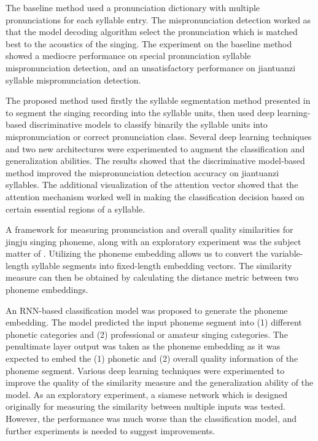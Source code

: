 The baseline method used a pronunciation dictionary with multiple pronunciations for each syllable entry. The mispronunciation detection worked as that the model decoding algorithm select the pronunciation which is matched best to the acoustics of the singing. The experiment on the baseline method showed a mediocre performance on special pronunciation syllable mispronunciation detection, and an unsatisfactory performance on jiantuanzi syllable mispronunciation detection.

The proposed method used firstly the syllable segmentation method presented in  to segment the singing recording into the syllable units, then used deep learning-based discriminative models to classify binarily the syllable units into mispronunciation or correct pronunciation class. Several deep learning techniques and two new architectures were experimented to augment the classification and generalization abilities. The results showed that the discriminative model-based method improved the mispronunciation detection accuracy on jiantuanzi syllables. The additional visualization of the attention vector showed that the attention mechanism worked well in making the classification decision based on certain essential regions of a syllable.

A framework for measuring pronunciation and overall quality similarities for jingju singing phoneme, along with an exploratory experiment was the subject matter of . Utilizing the phoneme embedding allows us to convert the variable-length syllable segments into fixed-length embedding vectors. The similarity measure can then be obtained by calculating the distance metric between two phoneme embeddings. 

An RNN-based classification model was proposed to generate the phoneme embedding. The model predicted the input phoneme segment into (1) different phonetic categories and (2) professional or amateur singing categories. The penultimate layer output was taken as the phoneme embedding as it was expected to embed the (1) phonetic and (2) overall quality information of the phoneme segment. Various deep learning techniques were experimented to improve the quality of the similarity measure and the generalization ability of the model. As an exploratory experiment, a siamese network which is designed originally for measuring the similarity between multiple inputs was tested. However, the performance was much worse than the classification model, and further experiments is needed to suggest improvements.

